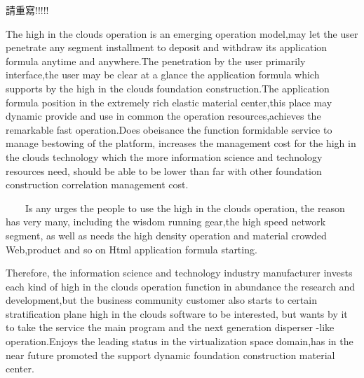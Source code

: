 請重寫!!!!!

The high in the clouds operation is an emerging operation model,may let the user penetrate any segment installment to deposit and withdraw its application formula anytime and anywhere.The penetration by the user primarily interface,the user may be clear at a glance the application formula which supports by the high in the clouds foundation construction.The application formula position in the extremely rich elastic material center,this place may dynamic provide and use in common the operation resources,achieves the remarkable fast operation.Does obeisance the function formidable service to manage bestowing of the platform, increases the management cost for the high in the clouds technology which the more information science and technology resources need, should be able to be lower than far with other foundation construction correlation management cost.

　　Is any urges the people to use the high in the clouds operation, the reason has very many, including the wisdom running gear,the high speed network segment, as well as needs the high density operation and material crowded Web,product and so on Html application formula starting.

    Therefore, the information science and technology industry manufacturer invests each kind of high in the clouds operation function in abundance the research and development,but the business community customer also starts to certain stratification plane high in the clouds software to be interested, but wants by it to take the service the main program and the next generation disperser -like operation.Enjoys the leading status in the virtualization space domain,has in the near future promoted the support dynamic foundation construction material center.
   

